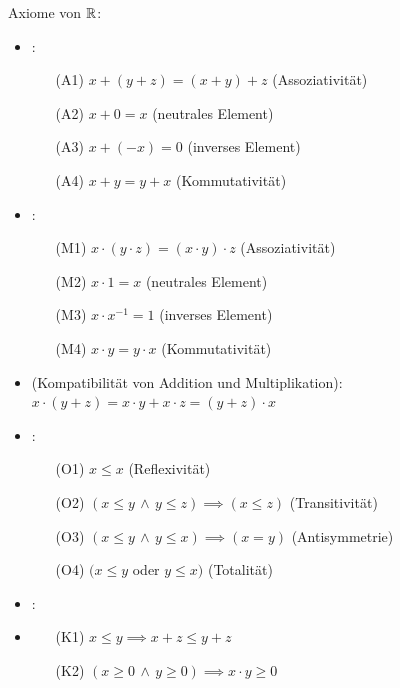 \Def Axiome von $\mathbb{R}$:
\vspace{-0.6em}
\begin{itemize}
    \item {}:
    \begin{itemize}
        \item[(A1)] $x + (y + z) = (x + y) + z$ (Assoziativität)
        \item[(A2)] $x + 0 = x$ (neutrales Element)
        \item[(A3)] $x + (-x) = 0$ (inverses Element)
        \item[(A4)] $x + y = y + x$ (Kommutativität) 
    \end{itemize}

    \item {}:
    \begin{itemize}
        \item[(M1)] $x \cdot (y \cdot z) = (x \cdot y) \cdot z$ (Assoziativität)
        \item[(M2)] $x \cdot 1 = x$ (neutrales Element)
        \item[(M3)] $x \cdot x^{-1} = 1$ (inverses Element)
        \item[(M4)] $x \cdot y = y \cdot x$ (Kommutativität)
    \end{itemize}
    
    \item {} (Kompatibilität von Addition und Multiplikation):
        $x \cdot (y + z) = x \cdot y + x \cdot z = (y + z) \cdot x$
    
    \item {}:
    \begin{itemize}
        \item[(O1)] $x\le x$ (Reflexivität)
        \item[(O2)] $(x\le y \, \land \, y\le z) \implies (x\le z)$ (Transitivität)
        \item[(O3)] $(x\le y \, \land \, y\le x) \implies (x = y)$ (Antisymmetrie)
        \item[(O4)] $(x\le y$ oder $y\le x)$ (Totalität)
    \end{itemize}

    \item {}:
    \item \begin{itemize}
        \item[(K1)] $x\le y \implies x + z\le y + z$
        \item[(K2)] $(x\ge 0 \, \land \, y\ge 0) \implies x \cdot y\ge 0$
    \end{itemize}
\end{itemize}

